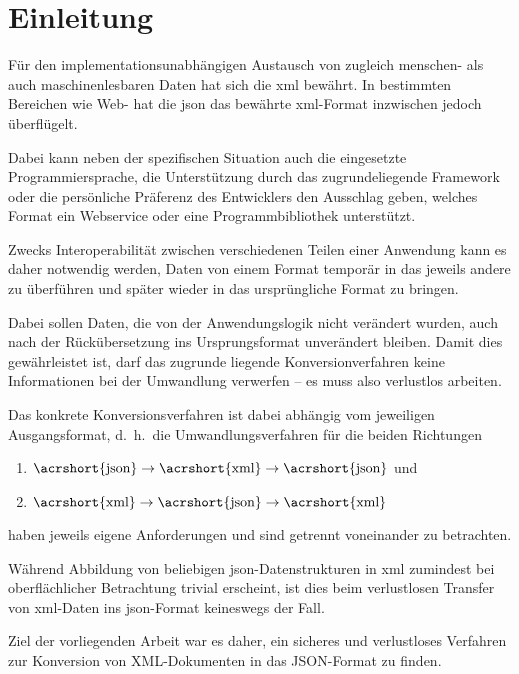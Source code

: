 \chapter{Einleitung} \label{chap:intro}

Für den implementationsunabhängigen Austausch von zugleich menschen- als auch
maschinenlesbaren Daten hat sich die \gls{xml}
bewährt. In bestimmten Bereichen wie Web- hat die \gls{json}
das bewährte \acrshort{xml}-Format inzwischen jedoch überflügelt.

Dabei kann neben der spezifischen Situation auch die eingesetzte
Programmiersprache, die Unterstützung durch das zugrundeliegende Framework
oder die persönliche Präferenz des Entwicklers den Ausschlag geben, welches
Format ein Webservice oder eine Programmbibliothek unterstützt.

Zwecks Interoperabilität zwischen verschiedenen Teilen einer Anwendung kann es
daher notwendig werden, Daten von einem Format temporär in das jeweils andere
zu überführen und später wieder in das ursprüngliche Format zu bringen.

Dabei sollen Daten, die von der Anwendungslogik nicht verändert wurden, auch
nach der Rückübersetzung ins Ursprungsformat unverändert bleiben. Damit dies
gewährleistet ist, darf das zugrunde liegende Konversionverfahren keine
Informationen bei der Umwandlung verwerfen -- es muss also verlustlos %
arbeiten.

Das konkrete Konversionsverfahren ist dabei abhängig vom jeweiligen
Ausgangsformat, d.~h.\ die Umwandlungsverfahren für die beiden Richtungen
\begin{enumerate}
    \item $\text{\acrshort{json}} \rightarrow \text{\acrshort{xml}} \rightarrow \text{\acrshort{json}}$ und
    \item $\text{\acrshort{xml}} \rightarrow \text{\acrshort{json}} \rightarrow \text{\acrshort{xml}}$
\end{enumerate}
haben jeweils eigene Anforderungen und sind getrennt voneinander zu betrachten.

Während Abbildung von beliebigen \acrshort{json}-Datenstrukturen in \acrshort{xml} zumindest bei
oberflächlicher Betrachtung trivial erscheint, ist dies beim verlustlosen
Transfer von \acrshort{xml}-Daten ins \acrshort{json}-Format keineswegs der Fall.

Ziel der vorliegenden Arbeit war es daher, ein sicheres und verlustloses
Verfahren zur Konversion von XML-Dokumenten in das JSON-Format zu finden.

